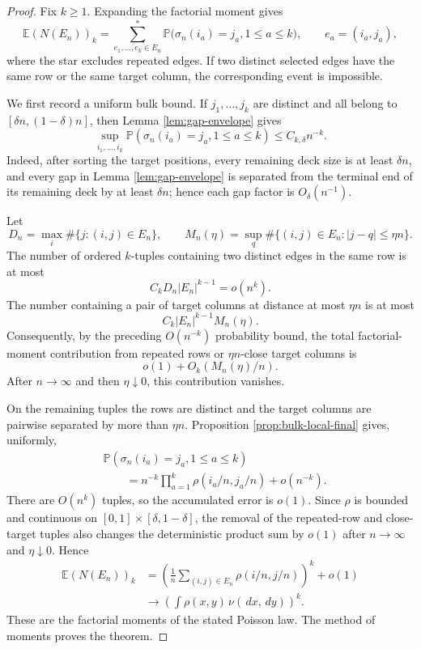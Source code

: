 \documentclass[11pt]{article}
\theoremstyle{remark}
\newcommand{\Pp}{\mathbb P}
\newcommand{\Ee}{\mathbb E}
\newcommand{\dd}{\,d}
\begin{document}
\begin{proof}
Fix $k\ge1$.  Expanding the factorial moment gives
\[
        \Ee(N(E_n))_k
        =\sum_{e_1,\ldots,e_k\in E_n}^{*}
        \Pp\bigl(\sigma_n(i_a)=j_a,
        1\le a\le k\bigr),
        \qquad e_a=(i_a,j_a),
\]
where the star excludes repeated edges.  If two distinct selected edges have the
same row or the same target column, the corresponding event is impossible.

We first record a uniform bulk bound.  If $j_1,\ldots,j_k$ are distinct and all
belong to $[\delta n,(1-\delta)n]$, then Lemma
\ref{lem:gap-envelope} gives
\[
        \sup_{i_1,\ldots,i_k}
        \Pp(\sigma_n(i_a)=j_a,1\le a\le k)
        \le C_{k,\delta}n^{-k}.
\]
Indeed, after sorting the target positions, every remaining deck size is at
least $\delta n$, and every gap in Lemma \ref{lem:gap-envelope} is separated
from the terminal end of its remaining deck by at least $\delta n$; hence each
gap factor is $O_\delta(n^{-1})$.

Let
\[
        D_n=\max_i\#\{j:(i,j)\in E_n\},
        \qquad
        M_n(\eta)=\sup_q
        \#\{(i,j)\in E_n:|j-q|\le\eta n\}.
\]
The number of ordered $k$-tuples containing two distinct edges in the same row
is at most
\[
        C_k D_n|E_n|^{k-1}=o(n^k).
\]
The number containing a pair of target columns at distance at most $\eta n$ is
at most
\[
        C_k |E_n|^{k-1}M_n(\eta).
\]
Consequently, by the preceding $O(n^{-k})$ probability bound, the total
factorial-moment contribution from repeated rows or $\eta n$-close target
columns is
\[
        o(1)+O_k(M_n(\eta)/n).
\]
After $n\to\infty$ and then $\eta\downarrow0$, this contribution vanishes.

On the remaining tuples the rows are distinct and the target columns are
pairwise separated by more than $\eta n$.  Proposition
\ref{prop:bulk-local-final} gives, uniformly,
\[
\begin{aligned}
        &\Pp(\sigma_n(i_a)=j_a,1\le a\le k)\\
        &\qquad=n^{-k}\prod_{a=1}^k
        \rho(i_a/n,j_a/n)+o(n^{-k}).
\end{aligned}
\]
There are $O(n^k)$ tuples, so the accumulated error is $o(1)$.  Since $\rho$ is
bounded and continuous on $[0,1]\times[\delta,1-\delta]$, the removal of the
repeated-row and close-target tuples also changes the deterministic product sum
by $o(1)$ after $n\to\infty$ and $\eta\downarrow0$.  Hence
\[
\begin{aligned}
        \Ee(N(E_n))_k
        &=\left(\frac1n\sum_{(i,j)\in E_n}
        \rho(i/n,j/n)\right)^k+o(1)\\
        &\longrightarrow
        \left(\int\rho(x,y)\,\nu(\dd x,\dd y)\right)^k.
\end{aligned}
\]
These are the factorial moments of the stated Poisson law.  The method of
moments proves the theorem.
\end{proof}
\end{document}
